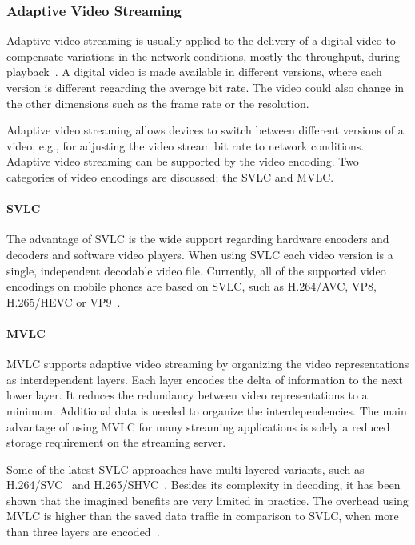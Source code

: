 \subsubsection{Adaptive Video Streaming}
\label{sec:205_video_adaptation}
Adaptive video streaming is usually applied to the delivery of a digital video to compensate variations in the network conditions, mostly the throughput, during playback~\cite{DeCicco2010}.
A digital video is made available in different versions, where each version is different regarding the average bit rate.
The video could also change in the other dimensions such as the frame rate or the resolution.

Adaptive video streaming allows devices to switch between different versions of a video, e.g., for adjusting the video stream bit rate to network conditions.
Adaptive video streaming can be supported by the video encoding. 
Two categories of video encodings are discussed: the \acf{SVLC} and \acf{MVLC}.
\paragraph{\acf{SVLC}}
The advantage of \ac{SVLC} is the wide support regarding hardware encoders and decoders and software video players.
When using \ac{SVLC} each video version is a single, independent decodable video file.
Currently, all of the supported video encodings on mobile phones are based on \ac{SVLC}, such as H.264/\ac{AVC}, VP8, H.265/\ac{HEVC} or VP9~\cite{Feller2011,Mukherjee2013,Sullivan2012,Wiegand2003}.
\paragraph{\acf{MVLC}}
\ac{MVLC} supports adaptive video streaming by organizing the video representations as interdependent layers.
Each layer encodes the delta of information to the next lower layer.
It reduces the redundancy between video representations to a minimum.
Additional data is needed to organize the interdependencies.
The main advantage of using \ac{MVLC} for many streaming applications is solely a reduced storage requirement on the streaming server.

Some of the latest \ac{SVLC} approaches have multi-layered variants, such as H.264/\ac{SVC}~\cite{Schwarz2007} and H.265/\ac{SHVC}~\cite{Boyce2016}.
Besides its complexity in decoding, it has been shown that the imagined benefits are very limited in practice.
The overhead using \ac{MVLC} is higher than the saved data traffic in comparison to \ac{SVLC}, when more than three layers are encoded~\cite{Grafl2013,Wang2013}. 

